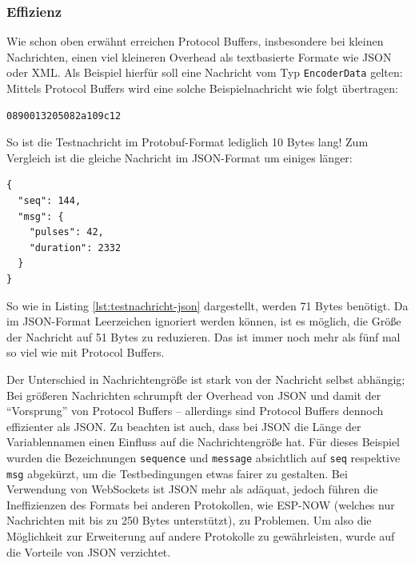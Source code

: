 \subsubsection{Effizienz}
Wie schon oben erwähnt erreichen Protocol Buffers,
insbesondere bei kleinen Nachrichten,
einen viel kleineren Overhead als textbasierte Formate wie JSON oder XML.
%
Als Beispiel hierfür soll eine Nachricht vom Typ \texttt{EncoderData} gelten:
%
Mittels Protocol Buffers wird eine solche Beispielnachricht wie folgt übertragen:
%
\begin{lstlisting}[label=lst:testnachricht-proto,caption=Testnachricht (Protobuf) in Hexadezimaldarstellung]
    0890013205082a109c12
\end{lstlisting}
So ist die Testnachricht im Protobuf-Format lediglich 10 Bytes lang!
%
Zum Vergleich ist die gleiche Nachricht im JSON-Format um einiges länger:
\begin{lstlisting}[label=lst:testnachricht-json,caption=Testnachricht (JSON) als formattierter String]
{
  "seq": 144,
  "msg": {
    "pulses": 42,
    "duration": 2332
  }
}
\end{lstlisting}
So wie in Listing \ref{lst:testnachricht-json} dargestellt,
werden 71 Bytes benötigt.
Da im JSON-Format Leerzeichen ignoriert werden können,
ist es möglich, die Größe der Nachricht auf 51 Bytes zu reduzieren.
%
Das ist immer noch mehr als fünf mal so viel wie mit Protocol Buffers.

Der Unterschied in Nachrichtengröße ist stark von der Nachricht selbst abhängig;
Bei größeren Nachrichten schrumpft der Overhead von JSON
und damit der ``Vorsprung'' von Protocol Buffers --
allerdings sind Protocol Buffers dennoch effizienter als JSON.
%
Zu beachten ist auch,
dass bei JSON die Länge der Variablennamen einen Einfluss auf die Nachrichtengröße hat.
%
Für dieses Beispiel wurden die Bezeichnungen \texttt{sequence} und \texttt{message} absichtlich auf
\texttt{seq} respektive \texttt{msg} abgekürzt,
um die Testbedingungen etwas fairer zu gestalten.
%
Bei Verwendung von WebSockets ist JSON mehr als adäquat,
jedoch führen die Ineffizienzen des Formats bei anderen Protokollen,
wie ESP-NOW \cite{esp-now} (welches nur Nachrichten mit bis zu 250 Bytes unterstützt),
zu Problemen.
%
Um also die Möglichkeit zur Erweiterung auf andere Protokolle zu gewährleisten,
wurde auf die Vorteile von JSON verzichtet.

